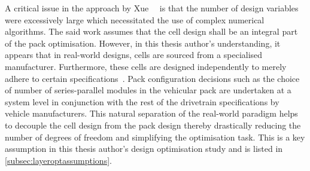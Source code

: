 A critical issue in the approach by Xue~\etal~\cite{Xue2013a} is that the number
of design variables were excessively large which necessitated the use of complex
numerical  algorithms.  The  said  work  assumes  that  the  cell  design  shall
be  an  integral  part  of  the  pack  optimisation.  However,  in  this  thesis
author's  understanding,  it  appears  that in  real-world  designs,  cells  are
sourced from a  specialised manufacturer. Furthermore, these  cells are designed
independently to merely  adhere to certain specifications~\cite{Maksimovic2012}.
Pack configuration  decisions such  as the choice  of number  of series-parallel
modules in  the vehicular pack are  undertaken at a system  level in conjunction
with the  rest of the  drivetrain specifications by vehicle  manufacturers. This
natural  separation  of the  real-world  paradigm  helps  to decouple  the  cell
design  from  the  pack  design  thereby  drastically  reducing  the  number  of
degrees  of  freedom and  simplifying  the  optimisation  task.  This is  a  key
assumption in  this thesis author's design  optimisation study and is  listed in
\cref{subsec:layeroptassumptions}.



